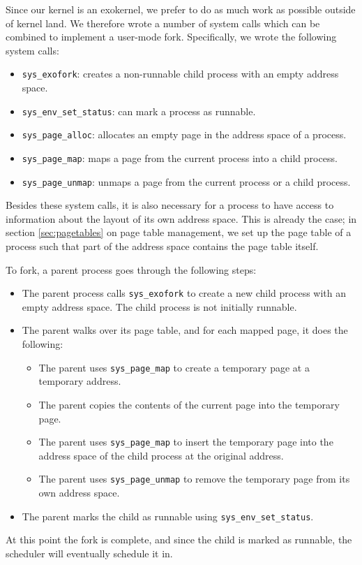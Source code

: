 \documentclass{article}
\begin{document}
Since our kernel is an exokernel, we prefer
to do as much work as possible outside of kernel land. We therefore wrote a
number of system calls which can be combined to implement a user-mode fork.
Specifically, we wrote the following system calls:
\begin{itemize}
\item	\texttt{sys\_exofork}: creates a non-runnable child process with an empty address space.
\item	\texttt{sys\_env\_set\_status}: can mark a process as runnable.
\item	\texttt{sys\_page\_alloc}: allocates an empty page in the address space of a process.
\item	\texttt{sys\_page\_map}: maps a page from the current process into a child process.
\item	\texttt{sys\_page\_unmap}: unmaps a page from the current process or a child process.
\end{itemize}
Besides these system calls, it is also necessary for a process to have access
to information about the layout of its own address space. This is already the
case; in section \ref{sec:pagetables} on page table management, we set up the
page table of a process such that part of the address space contains the page
table itself.

To fork, a parent process goes through the following steps:
\begin{itemize}
\item The parent process calls \texttt{sys\_exofork} to create a new child
process with an empty address space. The child process is not initially
runnable.
\item The parent walks over its page table, and for each mapped page, it does
the following:
\begin{itemize}
\item The parent uses \texttt{sys\_page\_map} to create a temporary page at a
temporary address.
\item The parent copies the contents of the current page into the temporary
page.
\item The parent uses \texttt{sys\_page\_map} to insert the temporary page
into the address space of the child process at the original address.
\item The parent uses \texttt{sys\_page\_unmap} to remove the temporary page
from its own address space.
\end{itemize}
\item The parent marks the child as runnable using
\texttt{sys\_env\_set\_status}. 
\end{itemize}
At this point the fork is complete, and since the child is marked as runnable,
the scheduler will eventually schedule it in.
\end{document}
